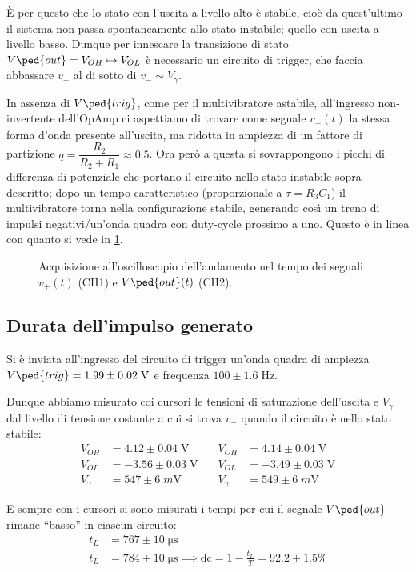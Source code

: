 \documentclass[10pt, a4paper, italian]{article}
\begin{document}
\`E per questo che lo stato con l'uscita a livello alto è stabile,
cioè da quest'ultimo il sistema non passa spontaneamente allo stato instabile;
quello con uscita a livello basso.
Dunque per innescare la transizione di stato
$V\ped{out} = V_{OH} \mapsto V_{OL}$ è necessario un circuito di trigger,
che faccia abbassare $v_+$ al di sotto di $v_- \sim V_\gamma$.

In assenza di $V\ped{trig}$, come per il multivibratore astabile, all'ingresso
non-invertente dell'OpAmp ci aspettiamo di trovare come segnale $v_+ (t)$ la
stessa forma d'onda presente all'uscita, ma ridotta in ampiezza di un fattore di partizione $q = \dfrac{R_2}{R_2 + R_1} \approx 0.5$.
Ora però a questa si sovrappongono i picchi di differenza di potenziale che
portano il circuito nello stato instabile sopra descritto; dopo un tempo
caratteristico (proporzionale a $\tau = R_3 C_1$) il multivibratore torna
nella configurazione stabile, generando così un treno di impulsi
negativi/un'onda quadra con duty-cycle prossimo a uno.
Questo è in linea con quanto si vede in \cref{fig: mstabilev+}.
\begin{figure}[htbp]
	\centering
	\caption{Acquisizione all'oscilloscopio dell'andamento nel tempo dei
	segnali $v_+ (t)$ (CH1) e $V\ped{out} (t)$ (CH2). \label{fig: mstabilev+}}
\end{figure}

\subsection{Durata dell'impulso generato}
Si è inviata all'ingresso del circuito di trigger un'onda quadra di ampiezza
$V\ped{trig} = 1.99 \pm 0.02 \; \si{\V}$ e frequenza $100 \pm 1.6 \; \si{\Hz}$.

Dunque abbiamo misurato coi cursori le tensioni di saturazione dell'uscita e 
$V_\gamma$ dal livello di tensione costante a cui si trova $v_-$ quando il
circuito è nello stato stabile:
\begin{align*}
V_{OH} &= 4.12 \pm 0.04 \; \si{\V} \quad &V_{OH} &= 4.14 \pm 0.04 \; \si{\V} \\
V_{OL} &= -3.56 \pm 0.03 \; \si{\V} \quad &V_{OL} &= -3.49 \pm 0.03 \; \si{\V} \\
V_{\gamma} &= 547 \pm 6 \; \si{m\V} \quad &V_{\gamma} &= 549 \pm 6 \; \si{m\V}
\end{align*}

E sempre con i cursori si sono misurati i tempi per cui il segnale $V\ped{out}$
rimane ``basso'' in ciascun circuito:
\begin{align*}
t_L &= 767 \pm 10 \;\si{\micro\s} \\
t_L &= 784 \pm 10 \;\si{\micro\s}
\implies \mathrm{dc} = 1 - \frac{t_L}{T} = 92.2 \pm 1.5 \% 
\end{align*}
\end{document}
